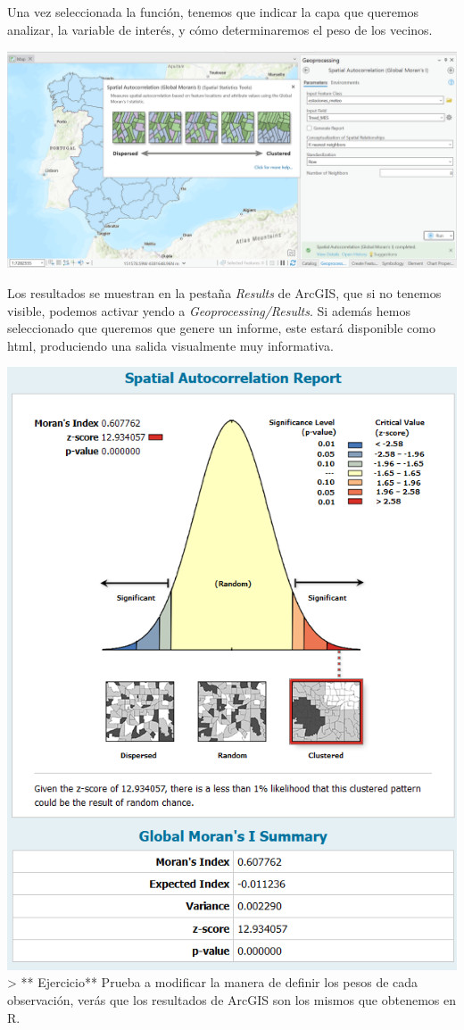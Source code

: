 \documentclass[
  letterpaper,
  DIV=11,
  numbers=noendperiod]{scrreprt}
\begin{document}
Una vez seleccionada la función, tenemos que indicar la capa que
queremos analizar, la variable de interés, y cómo determinaremos el peso
de los vecinos.

\includegraphics{images/MoranIToolbox2_ArcGISPro.png}

Los resultados se muestran en la pestaña \emph{Results} de ArcGIS, que
si no tenemos visible, podemos activar yendo a
\emph{Geoprocessing/Results}. Si además hemos seleccionado que queremos
que genere un informe, este estará disponible como html, produciendo una
salida visualmente muy informativa.

\includegraphics{images/MoranIToolbox3_ArcGISPro.png} \textgreater{} **
Ejercicio** Prueba a modificar la manera de definir los pesos de cada
observación, verás que los resultados de ArcGIS son los mismos que
obtenemos en R.
\end{document}
